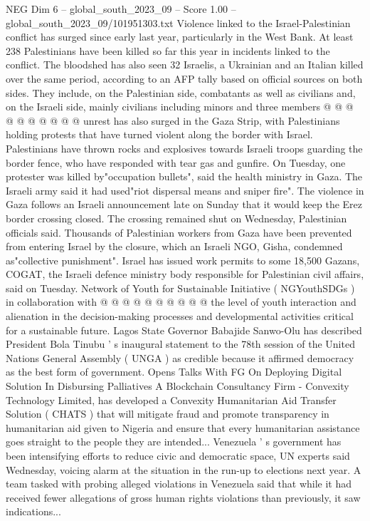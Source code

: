 \begin{textsample}{NEG Dim 6 – global\_south\_2023\_09 – Score 1.00 – global\_south\_2023\_09/101951303.txt}
Violence linked to the Israel-Palestinian conflict has surged since early last year, particularly in the West Bank.
At least 238 Palestinians have been killed so far this year in incidents linked to the conflict.
The bloodshed has also seen 32 Israelis, a Ukrainian and an Italian killed over the same period, according to an AFP tally based on official sources on both sides.
They include, on the Palestinian side, combatants as well as civilians and, on the Israeli side, mainly civilians including minors and three members @ @ @ @ @ @ @ @ @ @ unrest has also surged in the Gaza Strip, with Palestinians holding protests that have turned violent along the border with Israel.
Palestinians have thrown rocks and explosives towards Israeli troops guarding the border fence, who have responded with tear gas and gunfire.
On Tuesday, one protester was killed by"occupation bullets", said the health ministry in Gaza.
The Israeli army said it had used"riot dispersal means and sniper fire".
The violence in Gaza follows an Israeli announcement late on Sunday that it would keep the Erez border crossing closed.
The crossing remained shut on Wednesday, Palestinian officials said.
Thousands of Palestinian workers from Gaza have been prevented from entering Israel by the closure, which an Israeli NGO, Gisha, condemned as"collective punishment".
Israel has issued work permits to some 18,500 Gazans, COGAT, the Israeli defence ministry body responsible for Palestinian civil affairs, said on Tuesday.
Network of Youth for Sustainable Initiative ( NGYouthSDGs ) in collaboration with @ @ @ @ @ @ @ @ @ @ the level of youth interaction and alienation in the decision-making processes and developmental activities critical for a sustainable future.
Lagos State Governor Babajide Sanwo-Olu has described President Bola Tinubu ' s inaugural statement to the 78th session of the United Nations General Assembly ( UNGA ) as credible because it affirmed democracy as the best form of government.
Opens Talks With FG On Deploying Digital Solution In Disbursing Palliatives A Blockchain Consultancy Firm - Convexity Technology Limited, has developed a Convexity Humanitarian Aid Transfer Solution ( CHATS ) that will mitigate fraud and promote transparency in humanitarian aid given to Nigeria and ensure that every humanitarian assistance goes straight to the people they are intended...
Venezuela ' s government has been intensifying efforts to reduce civic and democratic space, UN experts said Wednesday, voicing alarm at the situation in the run-up to elections next year.
A team tasked with probing alleged violations in Venezuela said that while it had received fewer allegations of gross human rights violations than previously, it saw indications...

\end{textsample}
